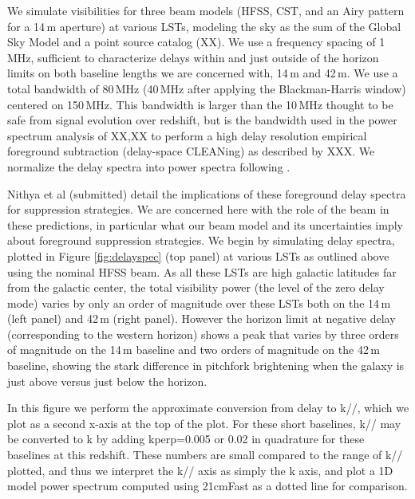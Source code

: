 \documentclass[preprint]{aastex}
\begin{document}
We simulate visibilities for three beam models (HFSS, CST, and an Airy pattern for a 14\,m aperture) at various LSTs, modeling the sky as the sum of the Global Sky Model \citep{gsm} and a point source catalog (XX). We use a frequency spacing of 1\,MHz, sufficient to characterize delays within and just outside of the horizon limits on both baseline lengths we are concerned with, 14\,m and 42\,m. We use a total bandwidth of 80\,MHz (40\,MHz after applying the Blackman-Harris window) centered on 150\,MHz. This bandwidth is larger than the 10\,MHz thought to be safe from signal evolution over redshift, but is the bandwidth used in the power spectrum analysis of XX,XX to perform a high delay resolution empirical foreground subtraction (delay-space CLEANing) as described by XXX. We normalize the delay spectra into power spectra following   \citet{nithya15}.

Nithya et al (submitted) detail the implications of these foreground delay spectra for suppression strategies. We are concerned here with the role of the beam in these predictions, in particular what our beam model and its uncertainties imply about foreground suppression strategies. We begin by simulating delay spectra, plotted in Figure \ref{fig:delayspec} (top panel) at various LSTs as outlined above using the nominal HFSS beam. As all these LSTs are high galactic latitudes far from the galactic center, the total visibility power (the level of the zero delay mode) varies by only an order of magnitude over these LSTs both on the 14\,m (left panel) and 42\,m (right panel). However the horizon limit at negative delay (corresponding to the western horizon) shows a peak that varies by three orders of magnitude on the 14\,m baseline and two orders of magnitude on the 42\,m baseline, showing the stark difference in pitchfork brightening when the galaxy is just above versus just below the horizon. 

In this figure we perform the approximate conversion from delay to k//, which we plot as a second x-axis at the top of the plot. For these short baselines, k// may be converted to k by adding kperp=0.005 or 0.02 in quadrature for these baselines at this redshift. These numbers are small compared to the range of k// plotted, and thus we interpret the k// axis as simply the k axis, and plot a 1D model power spectrum computed using 21cmFast as a dotted line for comparison. 
\end{document}
